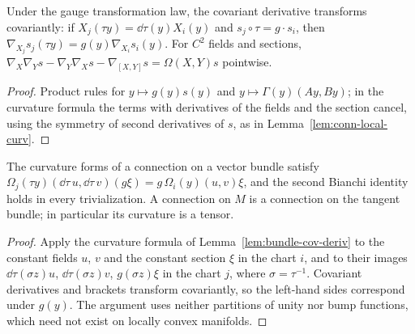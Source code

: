 \begin{lemma}
  \label{lem:bundle-cov-deriv}
  \leanok
  Under the gauge transformation law, the covariant derivative transforms covariantly:
  if $X_j(\tau y) = \dd\tau(y) X_i(y)$ and $s_j \circ \tau = g \cdot s_i$, then
  $\nabla_{X_j} s_j(\tau y) = g(y) \nabla_{X_i} s_i(y)$. For $C^2$ fields and sections,
  $\nabla_X\nabla_Y s - \nabla_Y\nabla_X s - \nabla_{[X, Y]} s = \Omega(X, Y) s$ pointwise.
\end{lemma}

\begin{proof}
  \leanok
  Product rules for $y \mapsto g(y)s(y)$ and $y \mapsto \Gamma(y)(A y, B y)$; in the curvature
  formula the terms with derivatives of the fields and the section cancel, using the symmetry of
  second derivatives of $s$, as in Lemma~\ref{lem:conn-local-curv}.
\end{proof}

\begin{theorem}
  \label{thm:curvature-gauge}
  \leanok
  The curvature forms of a connection on a vector bundle satisfy
  $\Omega_j(\tau y)(\dd\tau\, u, \dd\tau\, v)(g\xi) = g\,\Omega_i(y)(u, v)\xi$, and the second
  Bianchi identity holds in every trivialization. A connection on $M$ is a connection on the
  tangent bundle; in particular its curvature is a tensor.
\end{theorem}

\begin{proof}
  \leanok
  Apply the curvature formula of Lemma~\ref{lem:bundle-cov-deriv} to the constant fields $u$,
  $v$ and the constant section $\xi$ in the chart $i$, and to their images
  $\dd\tau(\sigma z)u$, $\dd\tau(\sigma z)v$, $g(\sigma z)\xi$ in the chart $j$, where
  $\sigma = \tau^{-1}$. Covariant derivatives and brackets transform covariantly, so the
  left-hand sides correspond under $g(y)$. The argument uses neither partitions of unity nor
  bump functions, which need not exist on locally convex manifolds.
\end{proof}

